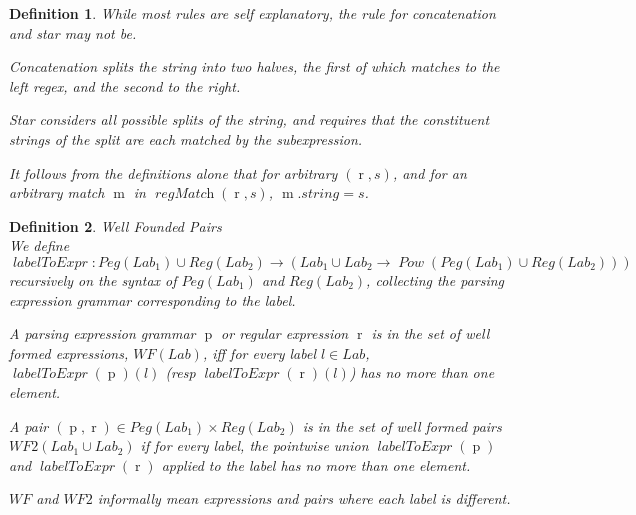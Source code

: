\documentclass[11pt]{article}
\newcommand{\synPeg}{\ensuremath{\operatorname{p}}}
\newcommand{\synReg}{\ensuremath{\operatorname{r}}}
\newcommand{\metaLab}{\ensuremath{l}}
\newcommand{\metaMatch}{\ensuremath{\operatorname{m}}}
\newcommand{\setPeg}{\mathit{Peg}}
\newcommand{\setReg}{\mathit{Reg}}
\newcommand{\setWF}{\mathit{WF}}
\newcommand{\setWFTwo}{\mathit{WF2}}
\newcommand{\setLab}{\mathit{Lab}}
\newcommand{\funLabelToExpr}{\operatorname{\mathit{labelToExpr}}}
\newcommand{\funPow}{\operatorname{\mathit{Pow}}}
\newcommand{\funRegMatch}{\operatorname{\mathit{regMatch}}}
\newtheorem{definition}{Definition}
\begin{document}
\begin{definition}
  While most rules are self explanatory, the rule for concatenation and star
  may not be.

  Concatenation splits the string into two halves, the first of
  which matches to the left regex, and the second to the right.

  Star considers all possible splits of the string, and requires that the
  constituent strings of the split are each matched by the subexpression.

  It follows from the definitions alone that for arbitrary
  $(\synReg, s)$, and for an arbitrary match $\metaMatch$ in
  $\funRegMatch(\synReg, s)$, $\metaMatch.\mathit{string} = s$.
\end{definition}



\begin{definition} Well Founded Pairs \\
  We define $\funLabelToExpr : \setPeg(\setLab_1) \cup \setReg(\setLab_2) \to
  (\setLab_1 \cup \setLab_2 \to \funPow(\setPeg(\setLab_1) \cup \setReg(\setLab_2)))$
  recursively on the syntax of $\setPeg(\setLab_1)$ and $\setReg(\setLab_2)$,
  collecting the parsing expression grammar corresponding to the label.

  A parsing expression grammar $\synPeg$ or regular expression $\synReg$ is in the set
  of well formed expressions, $\setWF(\setLab)$, iff for every label $\metaLab \in \setLab$,
  $\funLabelToExpr(\synPeg)(\metaLab)$ (resp $\funLabelToExpr(\synReg)(\metaLab)$)
  has no more than one element.

  A pair $(\synPeg, \synReg) \in \setPeg(\setLab_1) \times \setReg(\setLab_2)$
  is in the set of well formed pairs $\setWFTwo(\setLab_1 \cup \setLab_2)$
  if for every label, the pointwise union $\funLabelToExpr(\synPeg)$ and
  $\funLabelToExpr(\synReg)$ applied to the label has no more than one element.

  $\setWF$ and $\setWFTwo$ informally mean expressions and pairs where each
  label is different.
\end{definition}
\end{document}
